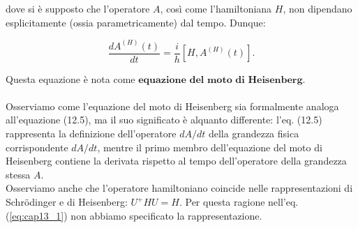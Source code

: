 \documentclass[a4paper,12pt,oneside]{book}
\begin{document}
\noindent dove si è supposto che l'operatore $A$, così come l'hamiltoniana $H$, non dipendano esplicitamente (ossia parametricamente) dal tempo. Dunque:

\begin{equation} \label{eq:cap13_1}
\frac{d A^{(H)}(t)}{dt} = \frac{i}{h} \left[H, A^{(H)}(t) \right].
\end{equation}

\noindent Questa equazione è nota come $\textbf{equazione del moto di Heisenberg}$.\\
\\
Osserviamo come l'equazione del moto di Heisenberg sia formalmente analoga all'equazione (12.5), ma il suo significato è alquanto differente: l'eq. (12.5) rappresenta la definizione dell'operatore $dA/dt$ della grandezza fisica corrispondente $dA/dt$, mentre il primo membro dell'equazione del moto di Heisenberg contiene la derivata rispetto al tempo dell'operatore della grandezza stessa $A$.\\
Osserviamo anche che l'operatore hamiltoniano coincide nelle rappresentazioni di Schrödinger e di Heisenberg: $U^\textbf{+} H U = H$. Per questa ragione nell'eq. (\ref{eq:cap13_1}) non abbiamo specificato la rappresentazione.
\end{document}
